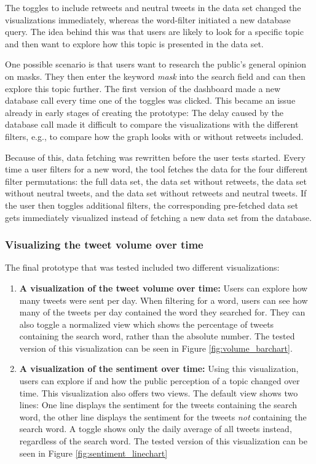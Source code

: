 The toggles to include retweets and neutral tweets in the data set changed the visualizations immediately, whereas the word-filter initiated a new database query. The idea behind this was that users are likely to look for a specific topic and then want to explore how this topic is presented in the data set.

One possible scenario is that users want to research the public's general opinion on masks. They then enter the keyword \emph{mask} into the search field and can then explore this topic further. The first version of the dashboard made a new database call every time one of the toggles was clicked. This became an issue already in early stages of creating the prototype: The delay caused by the database call made it difficult to compare the visualizations with the different filters, e.g., to compare how the graph looks with or without retweets included.

Because of this, data fetching was rewritten before the user tests started. Every time a user filters for a new word, the tool fetches the data for the four different filter permutations: the full data set, the data set without retweets, the data set without neutral tweets, and the data set without retweets and neutral tweets. If the user then toggles additional filters, the corresponding pre-fetched data set gets immediately visualized instead of fetching a new data set from the database.

\subsubsection{Visualizing the tweet volume over time}
The final prototype that was tested included two different visualizations:

\begin{enumerate}
    \item \textbf{A visualization of the tweet volume over time:} Users can explore how many tweets were sent per day. When filtering for a word, users can see how many of the tweets per day contained the word they searched for. They can also toggle a normalized view which shows the percentage of tweets containing the search word, rather than the absolute number. The tested version of this visualization can be seen in Figure \ref{fig:volume_barchart}.
    \item \textbf{A visualization of the sentiment over time:} Using this visualization, users can explore if and how the public perception of a topic changed over time. This visualization also offers two views. The default view shows two lines: One line displays the sentiment for the tweets containing the search word, the other line displays the sentiment for the tweets \emph{not} containing the search word. A toggle shows only the daily average of all tweets instead, regardless of the search word. The tested version of this visualization can be seen in Figure \ref{fig:sentiment_linechart}
\end{enumerate}

